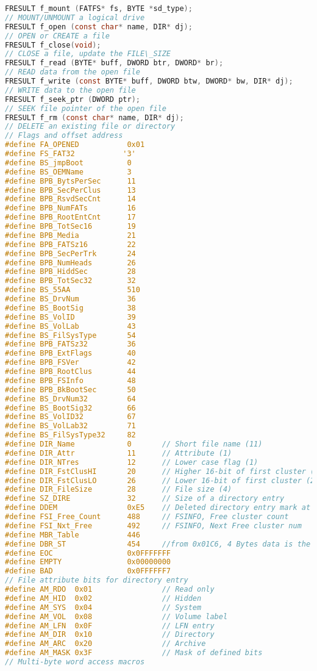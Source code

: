 \begin{lstlisting}[language={C}, caption={FAT.H}]
FRESULT f_mount (FATFS* fs, BYTE *sd_type);
// MOUNT/UNMOUNT a logical drive
FRESULT f_open (const char* name, DIR* dj);
// OPEN or CREATE a file
FRESULT f_close(void);
// CLOSE a file, update the FILE\_SIZE
FRESULT f_read (BYTE* buff, DWORD btr, DWORD* br);
// READ data from the open file
FRESULT f_write (const BYTE* buff, DWORD btw, DWORD* bw, DIR* dj);
// WRITE data to the open file
FRESULT f_seek_ptr (DWORD ptr);
// SEEK file pointer of the open file
FRESULT f_rm (const char* name, DIR* dj);
// DELETE an existing file or directory
// Flags and offset address
#define	FA_OPENED           0x01
#define FS_FAT32           '3'
#define BS_jmpBoot			0
#define BS_OEMName			3
#define BPB_BytsPerSec		11
#define BPB_SecPerClus		13
#define BPB_RsvdSecCnt		14
#define BPB_NumFATs			16
#define BPB_RootEntCnt		17
#define BPB_TotSec16		19
#define BPB_Media			21
#define BPB_FATSz16			22
#define BPB_SecPerTrk		24
#define BPB_NumHeads		26
#define BPB_HiddSec			28
#define BPB_TotSec32		32
#define BS_55AA				510
#define BS_DrvNum			36
#define BS_BootSig			38
#define BS_VolID			39
#define BS_VolLab			43
#define BS_FilSysType		54
#define BPB_FATSz32			36
#define BPB_ExtFlags		40
#define BPB_FSVer			42
#define BPB_RootClus		44
#define BPB_FSInfo			48
#define BPB_BkBootSec		50
#define BS_DrvNum32			64
#define BS_BootSig32		66
#define BS_VolID32			67
#define BS_VolLab32			71
#define BS_FilSysType32		82
#define	DIR_Name			0		// Short file name (11)
#define	DIR_Attr			11		// Attribute (1)
#define	DIR_NTres			12		// Lower case flag (1)
#define	DIR_FstClusHI		20		// Higher 16-bit of first cluster (2)
#define	DIR_FstClusLO		26		// Lower 16-bit of first cluster (2)
#define	DIR_FileSize		28		// File size (4)
#define	SZ_DIRE				32		// Size of a directory entry
#define	DDEM				0xE5	// Deleted directory entry mark at DIR\_Name[0]
#define FSI_Free_Count      488     // FSINFO, Free cluster count
#define FSI_Nxt_Free        492     // FSINFO, Next Free cluster num
#define MBR_Table			446
#define DBR_ST              454     //from 0x01C6, 4 Bytes data is the DBR\_ST\_SECTORS
#define EOC 				0x0FFFFFFF
#define EMPTY 				0x00000000
#define BAD 				0x0FFFFFF7
// File attribute bits for directory entry
#define	AM_RDO	0x01	            // Read only
#define	AM_HID	0x02	            // Hidden
#define	AM_SYS	0x04	            // System
#define	AM_VOL	0x08	            // Volume label
#define AM_LFN	0x0F	            // LFN entry
#define AM_DIR	0x10	            // Directory
#define AM_ARC	0x20	            // Archive
#define AM_MASK	0x3F	            // Mask of defined bits
// Multi-byte word access macros

\end{lstlisting}
